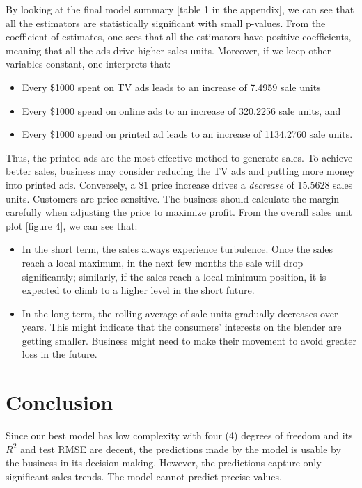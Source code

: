 By looking at the final model summary [table 1 in the appendix], we can see that all the estimators are statistically significant with small p-values. From the coefficient of estimates, one sees that all the estimators have positive coefficients, meaning that all the ads drive higher sales units. Moreover, if we keep other variables constant, one interprets that:
\begin{itemize}
  \item Every \$1000 spent on TV ads leads to an increase of 7.4959 sale units  
  \item Every \$1000 spend on online ads to an increase of 320.2256 sale units, and 
  \item Every \$1000 spend on printed ad leads to an increase of 1134.2760 sale units. 
\end{itemize}

Thus, the printed ads are the most effective method to generate sales. To achieve better sales, business may consider reducing the TV ads and putting more money into printed ads. Conversely, a \$1 price increase drives a \emph{decrease} of 15.5628 sales units. Customers are price sensitive. The business should calculate the margin carefully when adjusting the price to maximize profit. From the overall sales unit plot [figure 4], we can see that: 

\begin{itemize}
  \item In the short term, the sales always experience turbulence. Once the sales reach a local maximum, in the next few months the sale will drop significantly; similarly, if the sales reach a local minimum position, it is expected to climb to a higher level in the short future. 
  \item In the long term, the rolling average of sale units gradually decreases over years. This might indicate that the consumers’ interests on the blender are getting smaller. Business might need to make their movement to avoid greater loss in the future.
\end{itemize}

\section{Conclusion}
Since our best model has low complexity with four (4) degrees of freedom and its $R^2$ and test RMSE are decent, the predictions made by the model is usable by the business in its decision-making. However, the predictions capture only significant sales trends. The model cannot predict precise values.
